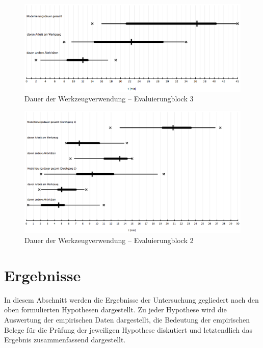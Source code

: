 \begin{figure}[htbp]
	\centering
		\includegraphics[width=15cm]{img/Evaluierung/usageTimeConceptMapping.png}
	\caption{Dauer der Werkzeugverwendung -- Evaluierungblock 3}
	\label{fig:img_Evaluierung_usageTimeConceptMapping}
\end{figure}

\begin{figure}[htbp]
	\centering
		\includegraphics[width=15cm]{img/Evaluierung/usageTimeNegotiation.png}
	\caption{Dauer der Werkzeugverwendung -- Evaluierungblock 2}
	\label{fig:img_Evaluierung_usageTimeNegotiation}
\end{figure}


\section{Ergebnisse} %
\label{sec:ergebnisse}

In diesem Abschnitt werden die Ergebnisse der Untersuchung gegliedert nach den oben formulierten Hypothesen dargestellt. Zu jeder Hypothese wird die Auswertung der empirischen Daten dargestellt, die Bedeutung der empirischen Belege für die Prüfung der jeweiligen Hypothese diskutiert und letztendlich das Ergebnis zusammenfassend dargestellt.  


